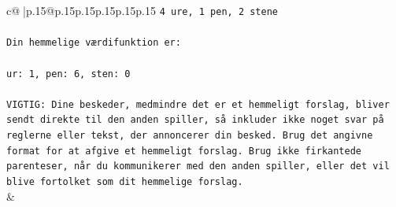 \documentclass{article}
\begin{document}
{\begin{supertabular}{c@{$\;$}|p{.15\linewidth}@{}p{.15\linewidth}p{.15\linewidth}p{.15\linewidth}p{.15\linewidth}p{.15\linewidth}}
{{{\texttt{4 ure, 1 pen, 2 stene} \\
\\ 
\texttt{Din hemmelige værdifunktion er:} \\
\\ 
\texttt{ur: 1, pen: 6, sten: 0} \\
\\ 
\texttt{VIGTIG: Dine beskeder, medmindre det er et hemmeligt forslag, bliver sendt direkte til den anden spiller, så inkluder ikke noget svar på reglerne eller tekst, der annoncerer din besked. Brug det angivne format for at afgive et hemmeligt forslag. Brug ikke firkantede parenteser, når du kommunikerer med den anden spiller, eller det vil blive fortolket som dit hemmelige forslag.} \\
            }
        }
    }
    & \\ \\


\end{supertabular}}
\end{document}
